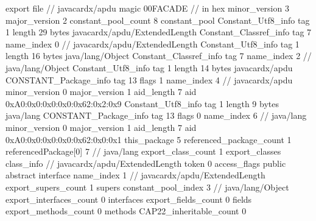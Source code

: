 export file {		// javacardx/apdu
	magic	00FACADE		 // in hex
	minor_version	3
	major_version	2
	constant_pool_count	8
	constant_pool {
		Constant_Utf8_info {
			tag	1
			length	29
			bytes	javacardx/apdu/ExtendedLength
		}
		Constant_Classref_info {
			tag	7
			name_index	0		// javacardx/apdu/ExtendedLength
		}
		Constant_Utf8_info {
			tag	1
			length	16
			bytes	java/lang/Object
		}
		Constant_Classref_info {
			tag	7
			name_index	2		// java/lang/Object
		}
		Constant_Utf8_info {
			tag	1
			length	14
			bytes	javacardx/apdu
		}
		CONSTANT_Package_info {
			tag	13
			flags	1
			name_index	4		// javacardx/apdu
			minor_version	0
			major_version	1
			aid_length	7
			aid	0xA0:0x0:0x0:0x0:0x62:0x2:0x9
		}
		Constant_Utf8_info {
			tag	1
			length	9
			bytes	java/lang
		}
		CONSTANT_Package_info {
			tag	13
			flags	0
			name_index	6		// java/lang
			minor_version	0
			major_version	1
			aid_length	7
			aid	0xA0:0x0:0x0:0x0:0x62:0x0:0x1
		}
	}
	this_package	5
	referenced_package_count	1
	referencedPackage[0]	7		// java/lang
	export_class_count	1
	export_classes {
		class_info {		// javacardx/apdu/ExtendedLength
			token	0
			access_flags	public abstract interface
			name_index	1		// javacardx/apdu/ExtendedLength
			export_supers_count	1
			supers {
				constant_pool_index	3		// java/lang/Object
			}
			export_interfaces_count	0
			interfaces {
			}
			export_fields_count	0
			fields {
			}
			export_methods_count	0
			methods {
			}
			CAP22_inheritable_count	0
		}
	}
}
